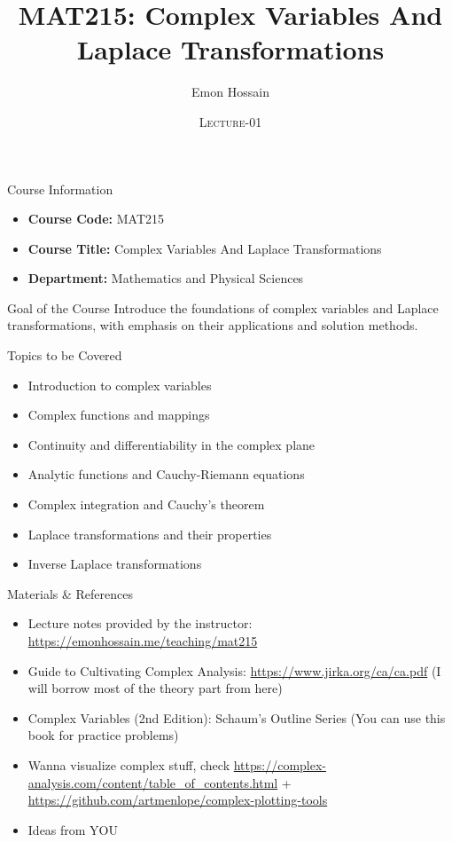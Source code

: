 \documentclass[11pt]{beamer}
\author[] %
{Emon Hossain\inst{1}}
\institute[University of Dhaka] %
{
  \inst{1}%
  Lecturer\\MNS department\\Brac University
}
\date[] %
{\textsc{Lecture-01}}
\title[]{MAT215: Complex Variables And Laplace Transformations}
\theoremstyle{plain}
\begin{document}
\begin{frame}
\titlepage
\end{frame}

\begin{frame}{Course Information}
\begin{itemize}[label=$\bullet$]
  \item \textbf{Course Code:} MAT215
  \item \textbf{Course Title:} Complex Variables And Laplace Transformations
  \item \textbf{Department:} Mathematics and Physical Sciences 
\end{itemize}

\vspace{0.8em}
\begin{block}{Goal of the Course}
Introduce the foundations of complex variables and Laplace transformations,
with emphasis on their applications and solution methods.
\end{block}
\end{frame}


\begin{frame}{Topics to be Covered}
\begin{itemize}[label=$\bullet$]
  \item Introduction to complex variables
  \item Complex functions and mappings
  \item Continuity and differentiability in the complex plane
  \item Analytic functions and Cauchy-Riemann equations
  \item Complex integration and Cauchy's theorem
  \item Laplace transformations and their properties
  \item Inverse Laplace transformations
\end{itemize}
\end{frame}


\begin{frame}{Materials \& References}
\begin{itemize}[label=$\bullet$]
  \item Lecture notes provided by the instructor: \url{https://emonhossain.me/teaching/mat215}
  \item Guide to Cultivating Complex Analysis: \url{https://www.jirka.org/ca/ca.pdf} (I will borrow most of the theory part from here)
  \item Complex Variables (2nd Edition): Schaum's Outline Series (You can use this book for practice problems)
  \item Wanna visualize complex stuff, check \url{https://complex-analysis.com/content/table_of_contents.html} + \url{https://github.com/artmenlope/complex-plotting-tools}
  \item Ideas from YOU
\end{itemize}
\end{frame}
\end{document}
